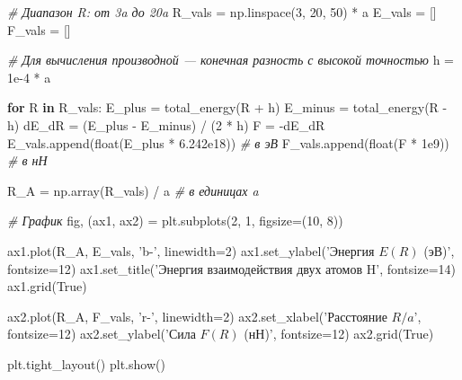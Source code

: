\documentclass[11pt]{article}
\newenvironment{Shaded}{}{}
\newcommand{\KeywordTok}[1]{\textcolor[rgb]{0.00,0.44,0.13}{\textbf{{#1}}}}
\newcommand{\DecValTok}[1]{\textcolor[rgb]{0.25,0.63,0.44}{{#1}}}
\newcommand{\FloatTok}[1]{\textcolor[rgb]{0.25,0.63,0.44}{{#1}}}
\newcommand{\StringTok}[1]{\textcolor[rgb]{0.25,0.44,0.63}{{#1}}}
\newcommand{\CommentTok}[1]{\textcolor[rgb]{0.38,0.63,0.69}{\textit{{#1}}}}
\newcommand{\NormalTok}[1]{{#1}}
\newcommand{\VariableTok}[1]{\textcolor[rgb]{0.10,0.09,0.49}{{#1}}}
\newcommand{\ControlFlowTok}[1]{\textcolor[rgb]{0.00,0.44,0.13}{\textbf{{#1}}}}
\newcommand{\OperatorTok}[1]{\textcolor[rgb]{0.40,0.40,0.40}{{#1}}}
\newcommand{\BuiltInTok}[1]{{#1}}
\begin{document}
\begin{Shaded}
\begin{Highlighting}[]
\CommentTok{# Диапазон R: от 3a до 20a}
\NormalTok{R_vals }\OperatorTok{=}\NormalTok{ np.linspace(}\DecValTok{3}\NormalTok{, }\DecValTok{20}\NormalTok{, }\DecValTok{50}\NormalTok{) }\OperatorTok{*}\NormalTok{ a}
\NormalTok{E_vals }\OperatorTok{=}\NormalTok{ []}
\NormalTok{F_vals }\OperatorTok{=}\NormalTok{ []}

\CommentTok{# Для вычисления производной — конечная разность с высокой точностью}
\NormalTok{h }\OperatorTok{=} \FloatTok{1e-4} \OperatorTok{*}\NormalTok{ a}

\ControlFlowTok{for}\NormalTok{ R }\KeywordTok{in}\NormalTok{ R_vals:}
\NormalTok{    E_plus }\OperatorTok{=}\NormalTok{ total_energy(R }\OperatorTok{+}\NormalTok{ h)}
\NormalTok{    E_minus }\OperatorTok{=}\NormalTok{ total_energy(R }\OperatorTok{-}\NormalTok{ h)}
\NormalTok{    dE_dR }\OperatorTok{=}\NormalTok{ (E_plus }\OperatorTok{-}\NormalTok{ E_minus) }\OperatorTok{/}\NormalTok{ (}\DecValTok{2} \OperatorTok{*}\NormalTok{ h)}
\NormalTok{    F }\OperatorTok{=} \OperatorTok{-}\NormalTok{dE_dR}
\NormalTok{    E_vals.append(}\BuiltInTok{float}\NormalTok{(E_plus }\OperatorTok{*} \FloatTok{6.242e18}\NormalTok{))  }\CommentTok{# в эВ}
\NormalTok{    F_vals.append(}\BuiltInTok{float}\NormalTok{(F }\OperatorTok{*} \FloatTok{1e9}\NormalTok{))            }\CommentTok{# в нН}

\NormalTok{R_A }\OperatorTok{=}\NormalTok{ np.array(R_vals) }\OperatorTok{/}\NormalTok{ a  }\CommentTok{# в единицах a}

\CommentTok{# График}
\NormalTok{fig, (ax1, ax2) }\OperatorTok{=}\NormalTok{ plt.subplots(}\DecValTok{2}\NormalTok{, }\DecValTok{1}\NormalTok{, figsize}\OperatorTok{=}\NormalTok{(}\DecValTok{10}\NormalTok{, }\DecValTok{8}\NormalTok{))}

\NormalTok{ax1.plot(R_A, E_vals, }\StringTok{'b-'}\NormalTok{, linewidth}\OperatorTok{=}\DecValTok{2}\NormalTok{)}
\NormalTok{ax1.set_ylabel(}\StringTok{'Энергия $E(R)$ (эВ)'}\NormalTok{, fontsize}\OperatorTok{=}\DecValTok{12}\NormalTok{)}
\NormalTok{ax1.set_title(}\StringTok{'Энергия взаимодействия двух атомов H'}\NormalTok{, fontsize}\OperatorTok{=}\DecValTok{14}\NormalTok{)}
\NormalTok{ax1.grid(}\VariableTok{True}\NormalTok{)}

\NormalTok{ax2.plot(R_A, F_vals, }\StringTok{'r-'}\NormalTok{, linewidth}\OperatorTok{=}\DecValTok{2}\NormalTok{)}
\NormalTok{ax2.set_xlabel(}\StringTok{'Расстояние $R / a$'}\NormalTok{, fontsize}\OperatorTok{=}\DecValTok{12}\NormalTok{)}
\NormalTok{ax2.set_ylabel(}\StringTok{'Сила $F(R)$ (нН)'}\NormalTok{, fontsize}\OperatorTok{=}\DecValTok{12}\NormalTok{)}
\NormalTok{ax2.grid(}\VariableTok{True}\NormalTok{)}

\NormalTok{plt.tight_layout()}
\NormalTok{plt.show()}
\end{Highlighting}
\end{Shaded}
\end{document}
